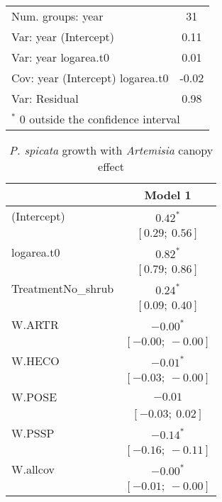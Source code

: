 \documentclass[11pt]{article}
\begin{document}
\begin{table}
\begin{center}
\begin{tabular}{l c }
Num. groups: year                & 31                \\
Var: year (Intercept)            & 0.11              \\
Var: year logarea.t0             & 0.01              \\
Cov: year (Intercept) logarea.t0 & -0.02             \\
Var: Residual                    & 0.98              \\
\hline
\multicolumn{2}{l}{\scriptsize{$^*$ 0 outside the confidence interval}}
\end{tabular}
\label{table:POSEgrowth-inARTR}
\end{center}
\end{table}


\begin{table}
\caption{\textit{P. spicata} growth with \textit{Artemisia} canopy effect}
\begin{center}
\begin{tabular}{l c }
\hline
 & Model 1 \\
\hline
(Intercept)                      & $0.42^{*}$        \\
                                 & $[0.29;\ 0.56]$   \\
logarea.t0                       & $0.82^{*}$        \\
                                 & $[0.79;\ 0.86]$   \\
TreatmentNo\_shrub               & $0.24^{*}$        \\
                                 & $[0.09;\ 0.40]$   \\
W.ARTR                           & $-0.00^{*}$       \\
                                 & $[-0.00;\ -0.00]$ \\
W.HECO                           & $-0.01^{*}$       \\
                                 & $[-0.03;\ -0.00]$ \\
W.POSE                           & $-0.01$           \\
                                 & $[-0.03;\ 0.02]$  \\
W.PSSP                           & $-0.14^{*}$       \\
                                 & $[-0.16;\ -0.11]$ \\
W.allcov                         & $-0.00^{*}$       \\
                                 & $[-0.01;\ -0.00]$ \\

\end{tabular}
\end{center}
\end{table}
\end{document}
